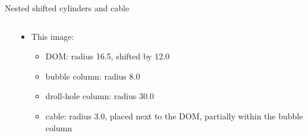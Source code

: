 
\begin{frame}[fragile]{Nested shifted cylinders and cable}

  \begin{columns}
    \begin{column}{0.6\textwidth}


    \end{column}
    \begin{column}{0.4\textwidth}

      \begin{itemize}
        \item This image:
          \begin{itemize}
            \item DOM: radius 16.5\cm, shifted by 12.0\cm
            \item bubble column: radius 8.0\cm
            \item droll-hole column: radius 30.0\cm
            \item cable: radius 3.0\cm, placed next to the DOM, partially within the bubble column
          \end{itemize}
      \end{itemize}

      \vspace{1cm}
    \end{column}
  \end{columns}

\end{frame}
